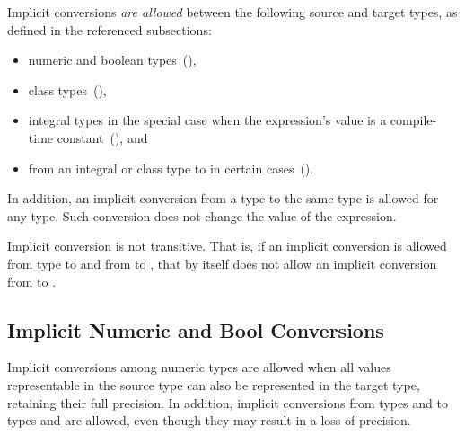 Implicit conversions \emph{are allowed} between
the following source and target types,
as defined in the referenced subsections:

\begin{itemize}
\item numeric and boolean types~(),
\item class types~(),
\item integral types in the special case when the expression's value
      is a compile-time constant~(), and
\item from an integral or class type to 
      in certain cases~().
\end{itemize}

In addition,
an implicit conversion from a type to the same type is allowed for any type.
Such conversion does not change the value of the expression.


Implicit conversion is not transitive. That is, if an implicit conversion
is allowed from type  to  and from  to ,
that by itself does not allow an implicit conversion
from  to .

\subsection{Implicit Numeric and Bool Conversions}
\label{Implicit_NumBool_Conversions}

Implicit conversions among numeric types are allowed when
all values representable in the source type can also be represented
in the target type, retaining their full precision.
%
%
In addition, implicit conversions from
types  and  to types 
and  are allowed, even though they may result in a loss of
precision.


